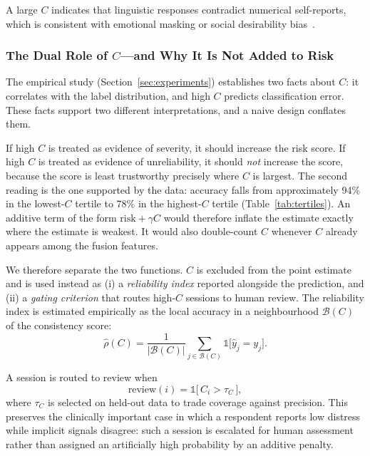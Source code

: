 \documentclass[12pt]{article}
\begin{document}
A large $C$ indicates that linguistic responses contradict numerical
self-reports, which is consistent with emotional masking or social
desirability bias~\cite{crowne1960social}.

\subsubsection{The Dual Role of $C$---and Why It Is Not Added to Risk}
\label{sec:dualrole}

The empirical study (Section~\ref{sec:experiments}) establishes two
facts about $C$: it correlates with the label distribution, and high $C$
predicts classification error. These facts support two different
interpretations, and a naive design conflates them.

If high $C$ is treated as evidence of severity, it should increase the
risk score. If high $C$ is treated as evidence of unreliability, it
should \emph{not} increase the score, because the score is least
trustworthy precisely where $C$ is largest. The second reading is the
one supported by the data: accuracy falls from approximately 94\% in
the lowest-$C$ tertile to 78\% in the highest-$C$ tertile
(Table~\ref{tab:tertiles}). An additive term of the form
$\text{risk} + \gamma C$ would therefore inflate the estimate exactly
where the estimate is weakest. It would also double-count $C$ whenever
$C$ already appears among the fusion features.

We therefore separate the two functions. $C$ is excluded from the point
estimate and is used instead as (i) a \emph{reliability index} reported
alongside the prediction, and (ii) a \emph{gating criterion} that routes
high-$C$ sessions to human review. The reliability index is estimated
empirically as the local accuracy in a neighbourhood
$\mathcal{B}(C)$ of the consistency score:
\begin{equation}
\hat{\rho}(C)
= \frac{1}{|\mathcal{B}(C)|}
  \sum_{j\in\mathcal{B}(C)} \mathbb{1}\bigl[\hat{y}_j = y_j\bigr] .
\end{equation}

\noindent A session is routed to review when
\begin{equation}
\text{review}(i) = \mathbb{1}\bigl[\,C_i > \tau_{C}\,\bigr],
\label{eq:gate}
\end{equation}
where $\tau_C$ is selected on held-out data to trade coverage against
precision. This preserves the clinically important case in which a
respondent reports low distress while implicit signals disagree: such a
session is escalated for human assessment rather than assigned an
artificially high probability by an additive penalty.
\end{document}
